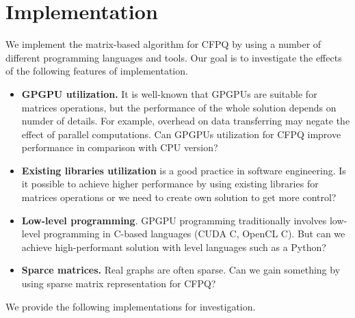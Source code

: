 \section{Implementation}

We implement the matrix-based algorithm for CFPQ by using a number of different programming languages and tools.
Our goal is to investigate the effects of the following features of implementation.
\begin{itemize}
\item \textbf{GPGPU utilization.}
It is well-known that GPGPUs are suitable for matrices operations, but the performance of the whole solution depends on numder of details. For example, overhead on data transferring may negate the effect of parallel computations.
Can GPGPUs utilization for CFPQ improve performance in comparison with CPU version?

\item \textbf{Existing libraries utilization} is a good practice in software engineering.
Is it possible to achieve higher performance by using existing libraries for matrices operations or we need to create own solution to get more control?

\item \textbf{Low-level programming}.
GPGPU programming traditionally involves low-level programming in C-based languages (CUDA C, OpenCL C).
But can we achieve high-performant solution with level languages such as a Python?

\item \textbf{Sparce matrices.} Real graphs are often sparse.
Can we gain something by using sparse matrix representation for CFPQ?

\end{itemize}

We provide the following implementations for investigation.

